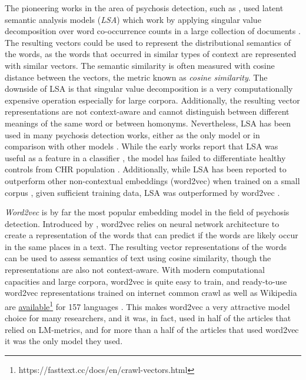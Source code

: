 The pioneering works in the area of psychosis detection, such as \citet{elvevaag2007quantifying, elvevaag2010automated}, used latent semantic analysis models (\textit{LSA}) which work by applying singular value decomposition over word co-occurrence counts in a large collection of documents \citep{landauer1998introduction}. The resulting vectors could be used to represent the distributional semantics of the words, as the words that occurred in similar types of context are represented with similar vectors. The semantic similarity is often measured with cosine distance between the vectors, the metric known as \textit{cosine similarity}. The downside of LSA is that singular value decomposition is a very computationally expensive operation especially for large corpora. Additionally, the resulting vector representations are not context-aware and cannot distinguish between different meanings of the same word or between homonyms. Nevertheless, LSA has been used in many psychosis detection works, either as the only model \citep{elvevaag2007quantifying, elvevaag2010automated, rosenstein2015language, bedi2015automated, haas2020linking} or in comparison with other models \citep{iter2018automatic, xu2020centroid, hitczenko2021understanding, tang2021natural, tang2023latent}. While the early works report that LSA was useful as a feature in a classifier \citep{elvevaag2007quantifying, elvevaag2010automated, rosenstein2015language, bedi2015automated}, the model has failed to differentiate healthy controls from CHR population \citep{hitczenko2021understanding, haas2020linking}. Additionally, while LSA has been reported to outperform other non-contextual embeddings (word2vec) when trained on a small corpus \citep{xu2020centroid}, given sufficient training data, LSA was outperformed by word2vec \citep{iter2018automatic, xu2020centroid}.

\textit{Word2vec} is by far the most popular embedding model in the field of psychosis detection. Introduced by \citet{mikolov2013distributed}, word2vec relies on neural network architecture to create a representation of the words that can predict if the words are likely occur in the same places in a text. The resulting vector representations of the words can be used to assess semantics of text using cosine similarity, though the representations are also not context-aware. With modern computational capacities and large corpora, word2vec is quite easy to train, and ready-to-use word2vec representations trained on internet common crawl as well as Wikipedia are \href{https://fasttext.cc/docs/en/crawl-vectors.html}{available}\footnote{https://fasttext.cc/docs/en/crawl-vectors.html} for 157 languages \citep{bojanowski2017enriching}. This makes word2vec a very attractive model choice for many researchers, and it was, in fact, used in half of the articles that relied on LM-metrics, and for more than a half of the articles that used word2vec it was the only model they used. 

